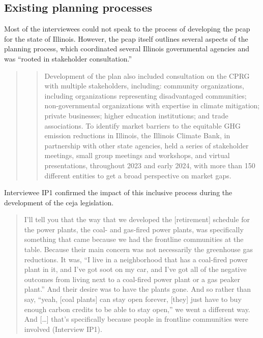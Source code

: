 \subsection{Existing planning processes}
Most of the interviewees could not speak to the process of developing the
\acf{pcap} for the state of Illinois. However, the \ac{pcap} itself outlines
several aspects of the planning process, which coordinated several Illinois
governmental agencies and was ``rooted in stakeholder consultation.''

\begin{quote}
    \blockcquote[10]{kibbey_state_2024}{Development of the plan also included
    consultation on the CPRG with multiple stakeholders, including: community
    organizations, including organizations representing disadvantaged
    communities; non-governmental organizations with expertise in climate
    mitigation; private businesses; higher education institutions; and trade
    associations. To identify market barriers to the equitable GHG emission
    reductions in Illinois, the Illinois Climate Bank, in partnership with other
    state agencies, held a series of stakeholder meetings, small group meetings
    and workshops, and virtual presentations, throughout 2023 and early 2024,
    with more than 150 different entities to get a broad perspective on market
    gaps.}
\end{quote}

Interviewee IP1 confirmed the impact of this inclusive process during the
development of the \ac{ceja} legislation.
\begin{quote}
     I'll tell you that the way that we developed the [retirement] schedule for
     the power plants, the coal- and gas-fired power plants, was specifically
     something that came because we had the frontline communities at the table.
     Because their main concern was not necessarily the greenhouse gas
     reductions. It was, ``I live in a neighborhood that has a coal-fired power
     plant in it, and I've got soot on my car, and I've got all of the negative
     outcomes from living next to a coal-fired power plant or a gas peaker
     plant.'' And their desire was to have the plants gone. And so rather than
     say, ``yeah, [coal plants] can stay open forever, [they] just have to buy
     enough carbon credits to be able to stay open,'' we went a different way.
     And [\dots] that's specifically because people in frontline communities
     were involved (Interview IP1).
\end{quote}

